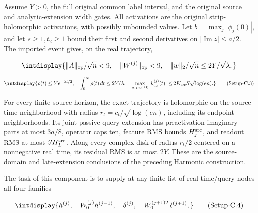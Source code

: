 Assume \(Y>0\), the full original common label interval, and the original source and analytic-extension width gates. All activations are the original strip-holomorphic activations, with possibly unbounded values. Let \(b=\max_j|\phi_j(0)|\), and let \(s\ge1,\allowbreak t_2\ge1\) bound their first and second derivatives on \( |\operatorname{Im}z|\le a/2\). The imported event gives, on the real trajectory,


\begingroup\renewcommand{\theHequation}{intdisplay.915}
\begin{equation*}
\intdisplay{
\|A\|_{\rm op}/\sqrt n<9,\quad
\|W^{(j)}\|_{\rm op}<9,\quad
\|w\|_2/\sqrt n\le2Y/\sqrt\lambda,
}
\end{equation*}
\endgroup

\label{int:eq-setup-c-3}
\begingroup\renewcommand{\theHequation}{intdisplay.916}
\begin{equation}
\intdisplay{
\rho(t)\le Ye^{-\lambda t/2},\quad
\int_0^\infty\rho(t)\,dt\le2Y/\lambda,
\quad \max_{a,j,i,t\ge0}|k_{a,i}^{(j)}(t)|
 \le2K_{\rm src}S\sqrt{\log(en)}.
}
\tag{Setup-C.3}
\label{int:eq-0459-setup-c-3}
\end{equation}
\endgroup


For every finite source horizon, the exact trajectory is holomorphic on the source time neighborhood with radius \(r_t=c_t/\sqrt{\log(en)}\), including its endpoint neighborhoods. Its joint passive-query extension has preactivation imaginary parts at most \(3a/8\), operator caps ten, feature RMS bounds \(H_j^{\rm src}\), and readout RMS at most \(SH_L^{\rm src}\). Along every complex disk of radius \(r_t/2\) centered on a nonnegative real time, its residual RMS is at most \(2Y\). These are the source-domain and late-extension conclusions of \hyperref[int:harmonic-construction]{the preceding Harmonic construction}.



The task of this component is to supply at any finite list of real time/query nodes all four families


\label{int:eq-setup-c-4}
\begingroup\renewcommand{\theHequation}{intdisplay.917}
\begin{equation}
\intdisplay{
h^{(j)},\quad W_0^{(j)}h^{(j-1)},\quad
\delta^{(j)},\quad W_0^{(j+1)T}\delta^{(j+1)},
}
\tag{Setup-C.4}
\label{int:eq-0460-setup-c-4}
\end{equation}
\endgroup


